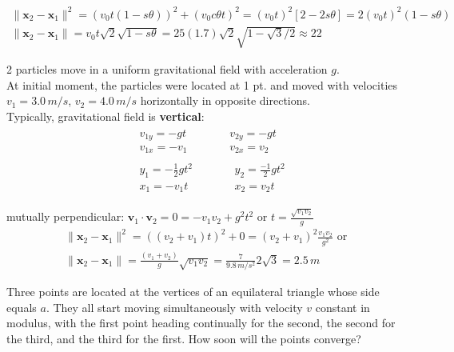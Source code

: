 \[
\begin{gathered}
	\| \mathbf{x}_2 - \mathbf{x}_1 \|^2 = (v_0 t(1 - s{\theta}))^2 + (v_0 c{\theta}t)^2 = (v_0 t)^2 [ 2 - 2 s{\theta}] = 2(v_0t)^2 (1- s{\theta}) \\
	\| \mathbf{x}_2 - \mathbf{x}_1 \| = \boxed{ v_0 t \sqrt{2} \sqrt{1 - s{\theta}} } = 25 (1.7) \sqrt{2} \sqrt{ 1 - \sqrt{3} / 2 } \approx 22
\end{gathered}
\]

 2 particles move in a uniform gravitational field with acceleration $g$.  \\
At initial moment, the particles were located at 1 pt. and moved with velocities $v_1 = 3.0 \, m/s$, $v_2 = 4.0 \, m/s$ horizontally in opposite directions. \\
Typically, gravitational field is \textbf{vertical}:
\[
\begin{gathered}
\begin{aligned} 
	& v_{1y} = -gt \\
	& v_{1x} = -v_1 
\end{aligned} \quad \quad \, \begin{aligned}
& v_{2y} = -gt \\
& v_{2x} = v_2 
\end{aligned} \\
	\begin{aligned}
		& y_1 = -\frac{1}{2} gt^2 \\
		& x_1=  -v_1 t
	\end{aligned} \quad \quad \, \begin{aligned}
	& y_2 = \frac{-1}{2} gt^2 \\
	& x_2 = v_2 t
\end{aligned}
\end{gathered}
\]

mutually perpendicular: $\mathbf{v}_1 \cdot \mathbf{v}_2 = 0 = -v_1 v_2 + g^2 t^2$ or $t = \frac{ \sqrt{v_1 v_2}}{g}$ \\

\[
\begin{gathered}
	\| \mathbf{x}_2 - \mathbf{x}_1 \|^2 = ((v_2 + v_1)t)^2 + 0 = (v_2 + v_1)^2 \frac{v_1 v_2}{g^2} \text{ or } \\
	\boxed{ \| \mathbf{x}_2 - \mathbf{x}_1 \| = \frac{ (v_1 + v_2) }{g} \sqrt{v_1 v_2} } = \frac{ 7 }{ 9.8 \, m/s^2} 2 \sqrt{3} = 2.5 \, m
\end{gathered}
\]

 Three points are located at the vertices of an equilateral triangle whose side equals $a$. They all start moving simultaneously with velocity $v$ constant in modulus, with the first point heading continually for the second, the second for the third, and the third for the first. How soon will the points converge?

